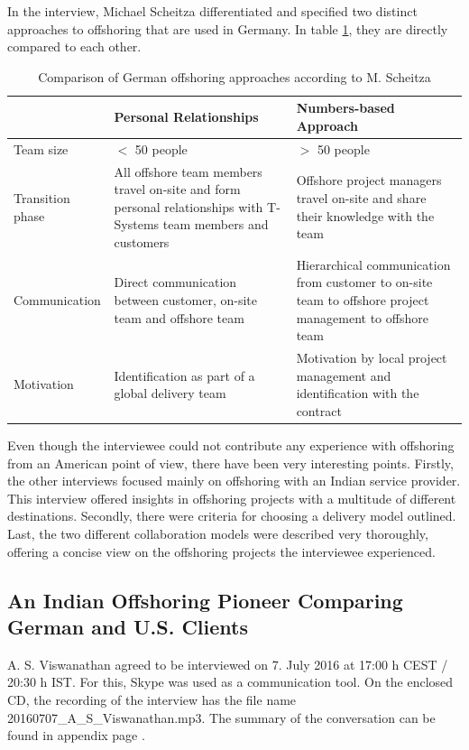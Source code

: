In the interview, Michael Scheitza differentiated and specified two distinct approaches to offshoring that are used in Germany. In table \ref{tab:ScheitzaApproaches}, they are directly compared to each other. 
\vspace{3mm}
\begin{table}[htb]
	\centering
	\begin{tabular}{l|p{5.8cm}|p{5.8cm}}
		& \textbf{Personal Relationships} & \textbf{Numbers-based Approach}\\\hline
		
		\rule{0pt}{3ex}Team size &$<$ 50 people &$>$ 50 people\\ \hline
		\rule{0pt}{3ex}Transition phase&All offshore team members travel on-site and form personal relationships with T-Systems team members and customers &Offshore project managers travel on-site and share their knowledge with the team\\ \hline
		\rule{0pt}{3ex}Communication &Direct communication between customer, on-site team and offshore team & Hierarchical communication from customer to on-site team to offshore project management to offshore team \\ \hline
		\rule{0pt}{3ex}Motivation &Identification as part of a global delivery team &Motivation by local project management and identification with the contract \\ \hline
	\end{tabular}
		\vspace{3mm}
		\caption{Comparison of German offshoring approaches according to M. Scheitza}
		\label{tab:ScheitzaApproaches}
\end{table}

Even though the interviewee could not contribute any experience with offshoring from an American point of view, there have been very interesting points. Firstly, the other interviews focused mainly on offshoring with an Indian service provider. This interview offered insights in offshoring projects with a multitude of different destinations. Secondly, there were criteria for choosing a delivery model outlined. Last, the two different collaboration models were described very thoroughly, offering a concise view on the offshoring projects the interviewee experienced.


\subsection{An Indian Offshoring Pioneer Comparing German and U.S. Clients}
A. S. Viswanathan agreed to be interviewed on 7. July 2016 at 17:00 h CEST / 20:30 h IST. For this, Skype was used as a communication tool. On the enclosed CD, the recording of the interview has the file name 20160707\_A\_S\_Viswanathan.mp3. The summary of the conversation can be found in appendix page \pageref{int:Viswanathan}.
